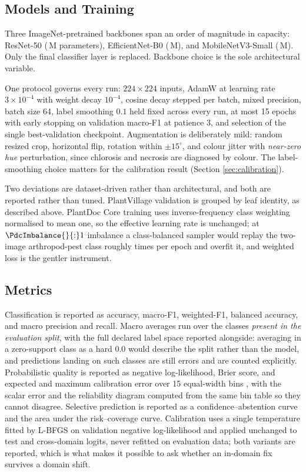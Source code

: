\documentclass[runningheads]{llncs}
\begin{document}
\subsection{Models and Training}

Three ImageNet-pretrained \cite{deng2009imagenet} backbones span an order of
magnitude in capacity: ResNet-50 \cite{he2016resnet} (\ParamsRn{}\,M
parameters), EfficientNet-B0 \cite{tan2019efficientnet} (\ParamsEb{}\,M), and
MobileNetV3-Small \cite{howard2019mobilenetv3} (\ParamsMn{}\,M). Only the final
classifier layer is replaced. Backbone choice is the sole architectural
variable.

One protocol governs every run: $224 \times 224$ inputs, AdamW at learning rate
$3\times10^{-4}$ with weight decay $10^{-4}$, cosine decay stepped per batch,
mixed precision, batch size 64, label smoothing $0.1$ held fixed across every
run, at most 15 epochs with early stopping on validation macro-F1 at patience 3,
and selection of the single best-validation checkpoint. Augmentation is
deliberately mild: random resized crop, horizontal flip, rotation within
$\pm15^{\circ}$, and colour jitter with \emph{near-zero hue} perturbation, since
chlorosis and necrosis are diagnosed by colour. The label-smoothing choice
matters for the calibration result (Section \ref{sec:calibration}).

Two deviations are dataset-driven rather than architectural, and both are
reported rather than tuned. PlantVillage validation is grouped by leaf identity,
as described above. PlantDoc Core training uses inverse-frequency class weighting
normalised to mean one, so the effective learning rate is unchanged; at
$\PdcImbalance{}{:}1$ imbalance a class-balanced sampler would replay the
two-image arthropod-pest class roughly \PdcImbalance{} times per epoch and
overfit it, and weighted loss is the gentler instrument.

\subsection{Metrics}

Classification is reported as accuracy, macro-F1, weighted-F1, balanced
accuracy, and macro precision and recall. Macro averages run over the classes
\emph{present in the evaluation split}, with the full declared label space
reported alongside: averaging in a zero-support class as a hard $0.0$ would
describe the split rather than the model, and predictions landing on such classes
are still errors and are counted explicitly. Probabilistic quality is reported as
negative log-likelihood, Brier score, and expected and maximum calibration error
over 15 equal-width bins \cite{naeini2015ece}, with the scalar error and the
reliability diagram computed from the same bin table so they cannot disagree.
Selective prediction \cite{geifman2017selective} is reported as a
confidence--abstention curve and the area under the risk--coverage curve.
Calibration uses a single temperature fitted by L-BFGS on validation negative
log-likelihood and applied unchanged to test and cross-domain logits, never
refitted on evaluation data; both variants are reported, which is what makes it
possible to ask whether an in-domain fix survives a domain shift.
\end{document}

